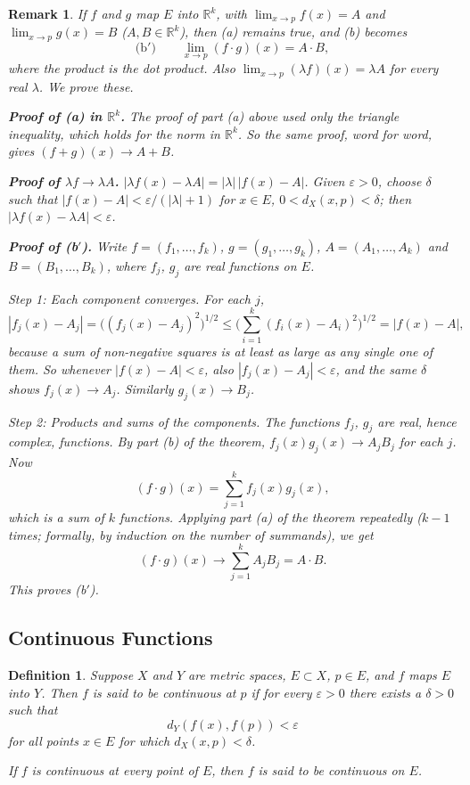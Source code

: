 \documentclass{article}
\theoremstyle{mythm}
\newtheorem{definition}[theorem]{Definition}
\newtheorem{remark}[theorem]{Remark}
\begin{document}
\begin{remark}\label{rem:Rk}
If $f$ and $g$ map $E$ into $\mathbb{R}^k$, with $\lim_{x\to p} f(x) = A$ and $\lim_{x\to p} g(x) = B$ ($A, B \in \mathbb{R}^k$), then (a) remains true, and (b) becomes
\[
\text{(b$'$)} \qquad \lim_{x \to p} (f \cdot g)(x) = A \cdot B,
\]
where the product is the dot product. Also $\lim_{x \to p} (\lambda f)(x) = \lambda A$ for every real $\lambda$. We prove these.

\textbf{Proof of (a) in $\mathbb{R}^k$.} The proof of part (a) above used only the triangle inequality, which holds for the norm in $\mathbb{R}^k$. So the same proof, word for word, gives $(f+g)(x) \to A + B$.

\textbf{Proof of $\lambda f \to \lambda A$.} $|\lambda f(x) - \lambda A| = |\lambda|\,|f(x) - A|$. Given $\varepsilon > 0$, choose $\delta$ such that $|f(x) - A| < \varepsilon/(|\lambda|+1)$ for $x \in E$, $0 < d_X(x,p) < \delta$; then $|\lambda f(x) - \lambda A| < \varepsilon$.

\textbf{Proof of (b$'$).} Write $f = (f_1, \dots, f_k)$, $g = (g_1,\dots,g_k)$, $A = (A_1, \dots, A_k)$ and $B = (B_1, \dots, B_k)$, where $f_j$, $g_j$ are real functions on $E$.

\textit{Step 1: Each component converges.} For each $j$,
\[
|f_j(x) - A_j| = \big( (f_j(x) - A_j)^2 \big)^{1/2} \leq \Big( \sum_{i=1}^k (f_i(x) - A_i)^2 \Big)^{1/2} = |f(x) - A|,
\]
because a sum of non-negative squares is at least as large as any single one of them. So whenever $|f(x) - A| < \varepsilon$, also $|f_j(x) - A_j| < \varepsilon$, and the same $\delta$ shows $f_j(x) \to A_j$. Similarly $g_j(x) \to B_j$.

\textit{Step 2: Products and sums of the components.} The functions $f_j$, $g_j$ are real, hence complex, functions. By part (b) of the theorem, $f_j(x) g_j(x) \to A_j B_j$ for each $j$. Now
\[
(f \cdot g)(x) = \sum_{j=1}^k f_j(x) g_j(x),
\]
which is a sum of $k$ functions. Applying part (a) of the theorem repeatedly ($k-1$ times; formally, by induction on the number of summands), we get
\[
(f\cdot g)(x) \to \sum_{j=1}^k A_j B_j = A \cdot B.
\]
This proves (b$'$).
\end{remark}

\subsection{Continuous Functions}

\begin{definition}\label{def:cont}
Suppose $X$ and $Y$ are metric spaces, $E \subset X$, $p \in E$, and $f$ maps $E$ into $Y$. Then $f$ is said to be \textit{continuous at $p$} if for every $\varepsilon > 0$ there exists a $\delta > 0$ such that
\[
d_Y(f(x), f(p)) < \varepsilon
\]
for all points $x \in E$ for which $d_X(x, p) < \delta$.

If $f$ is continuous at every point of $E$, then $f$ is said to be \textit{continuous on $E$}.
\end{definition}
\end{document}
